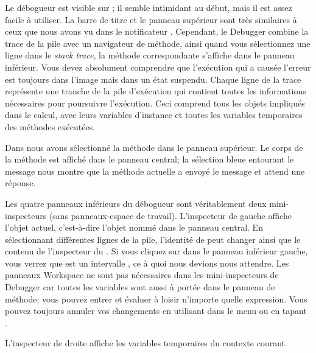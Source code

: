 \documentclass[a4paper,10pt,twoside]{book}
\begin{document}
Le débogueur est visible sur ; 
il semble intimidant au début, mais il est assez facile à utiliser.
La barre de titre et le panneau supérieur sont très similaires
à ceux que nous avons vu dans le notificateur .
Cependant, le Debugger combine la trace de la pile avec un navigateur de
méthode, ainsi quand vous sélectionnez une ligne dans le \emph{stack
trace}, la méthode correspondante s'affiche dans le panneau inférieur.
Vous devez absolument comprendre que l'exécution qui a causée l'erreur
est toujours dans l'image mais dans un état suspendu.
Chaque ligne de la trace représente une tranche de la pile
d'exécution qui contient toutes les informations nécessaires
pour poursuivre l'exécution. Ceci comprend tous les objets impliqués
dans le calcul, avec leurs variables d'instance et toutes les variables
temporaires des méthodes exécutées.

Dans  nous avons sélectionné
la méthode  dans le panneau supérieur.
Le corps de la méthode est affiché dans le panneau central;
la sélection bleue entourant le message  nous montre
que la méthode actuelle a envoyé le message  et
attend une réponse.

Les quatre panneaux inférieurs du débogueur sont véritablement deux
mini-inspecteurs (sans panneaux-espace de travail).
L'inspecteur de gauche affiche l'objet actuel,
c'est-à-dire l'objet nommé \self dans le panneau central.
En sélectionnant différentes lignes de la pile, l'identité de \self
peut changer ainsi que le contenu de
l'inspecteur du \self{}.
Si vous cliquez sur \self dans le panneau inférieur gauche, vous verrez
que \self est un intervalle , ce à quoi nous devions
nous attendre.
Les panneaux Workspace ne sont pas nécessaires dans les mini-inspecteurs
de Debugger car toutes les variables sont aussi à portée dans
le panneau de méthode; vous pouvez entrer et évaluer à loisir 
n'importe quelle expression.
Vous pouvez toujours annuler vos changements en utilisant 
 dans le menu ou en tapant . 

L'inspecteur de droite affiche les variables temporaires du contexte courant.
\end{document}

